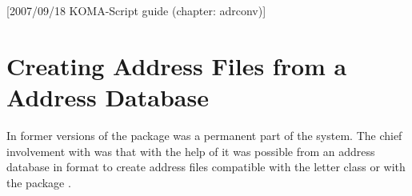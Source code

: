 %
%
%
%
%
%
%
%
% 
%
%
%
%

[2007/09/18 KOMA-Script guide (chapter:
  adrconv)]

\chapter{Creating Address Files from a Address Database}%
%
%
%

In former versions of {\KOMAScript} the package  was
a permanent part of the {\KOMAScript} system.  The chief involvement
with {\KOMAScript} was that with the help of  it was
possible from an address database in {\BibTeX} format to create
address files compatible with the {\KOMAScript} letter class or with
the package .

